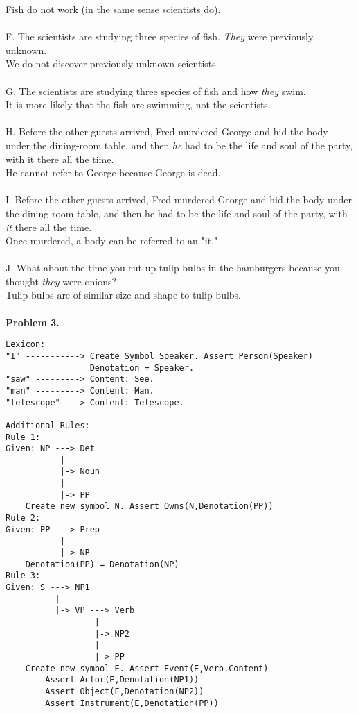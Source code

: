 \documentclass{article}
\begin{document}
Fish do not work (in the same sense scientists do).\\
\\
F. The scientists are studying three species of fish. \textit{They} were previously unknown.\\
We do not discover previously unknown scientists.\\
\\
G. The scientists are studying three species of fish and how \textit{they} swim.\\
It is more likely that the fish are swimming, not the scientists.\\
\\
H. Before the other guests arrived, Fred murdered George and hid the body under the dining-room table, and then \textit{he} had to be the life and soul of the party, with it there all the time.\\
He cannot refer to George because George is dead.\\
\\
I. Before the other guests arrived, Fred murdered George and hid the body under the dining-room table, and then he had to be the life and soul of the party, with \textit{it} there all the time.\\
Once murdered, a body can be referred to an "it."\\
\\
J. What about the time you cut up tulip bulbs in the hamburgers because you thought \textit{they} were onions?\\
Tulip bulbs are of similar size and shape to tulip bulbs.\\
\\
\textbf{Problem 3.}
\begin{lstlisting}
Lexicon:
"I" -----------> Create Symbol Speaker. Assert Person(Speaker)
                 Denotation = Speaker.
"saw" ---------> Content: See.
"man" ---------> Content: Man.
"telescope" ---> Content: Telescope.

Additional Rules:
Rule 1:
Given: NP ---> Det
           |
           |-> Noun
           |
           |-> PP
    Create new symbol N. Assert Owns(N,Denotation(PP))
Rule 2:
Given: PP ---> Prep
           |
           |-> NP
    Denotation(PP) = Denotation(NP)
Rule 3:
Given: S ---> NP1
          |
          |-> VP ---> Verb
                  |
                  |-> NP2
                  |             
                  |-> PP
    Create new symbol E. Assert Event(E,Verb.Content)
        Assert Actor(E,Denotation(NP1))
        Assert Object(E,Denotation(NP2))
        Assert Instrument(E,Denotation(PP))
\end{lstlisting}
\end{document}
